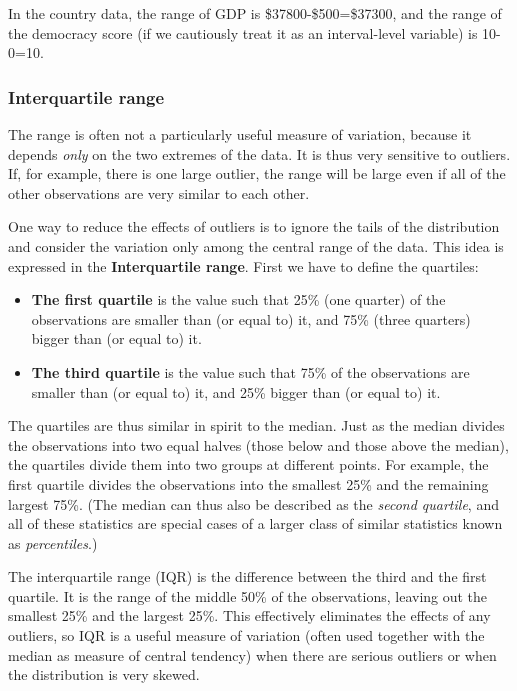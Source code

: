 \documentclass[11pt,a4paper,openany]{book}
\begin{document}
In the country data, the range of GDP is \$37800-\$500=\$37300, and the
range of the democracy score (if we cautiously treat it as an
interval-level variable) is 10-0=10.

\subsubsection*{Interquartile range}\label{interquartile-range}

The range is often not a particularly useful measure of variation,
because it depends \emph{only} on the two extremes of the data. It is
thus very sensitive to outliers. If, for example, there is one large
outlier, the range will be large even if all of the other observations
are very similar to each other.

One way to reduce the effects of outliers is to ignore the tails of the
distribution and consider the variation only among the central range of
the data. This idea is expressed in the \textbf{Interquartile range}.
First we have to define the quartiles:

\begin{itemize}
\item
  \textbf{The first quartile} is the value such that 25\% (one quarter)
  of the observations are smaller than (or equal to) it, and 75\% (three
  quarters) bigger than (or equal to) it.
\item
  \textbf{The third quartile} is the value such that 75\% of the
  observations are smaller than (or equal to) it, and 25\% bigger than
  (or equal to) it.
\end{itemize}

The quartiles are thus similar in spirit to the median. Just as the
median divides the observations into two equal halves (those below and
those above the median), the quartiles divide them into two groups at
different points. For example, the first quartile divides the
observations into the smallest 25\% and the remaining largest 75\%. (The
median can thus also be described as the \emph{second quartile}, and all
of these statistics are special cases of a larger class of similar
statistics known as \emph{percentiles}.)

The interquartile range (IQR) is the difference between the third and
the first quartile. It is the range of the middle 50\% of the
observations, leaving out the smallest 25\% and the largest 25\%. This
effectively eliminates the effects of any outliers, so IQR is a useful
measure of variation (often used together with the median as measure of
central tendency) when there are serious outliers or when the
distribution is very skewed.
\end{document}

